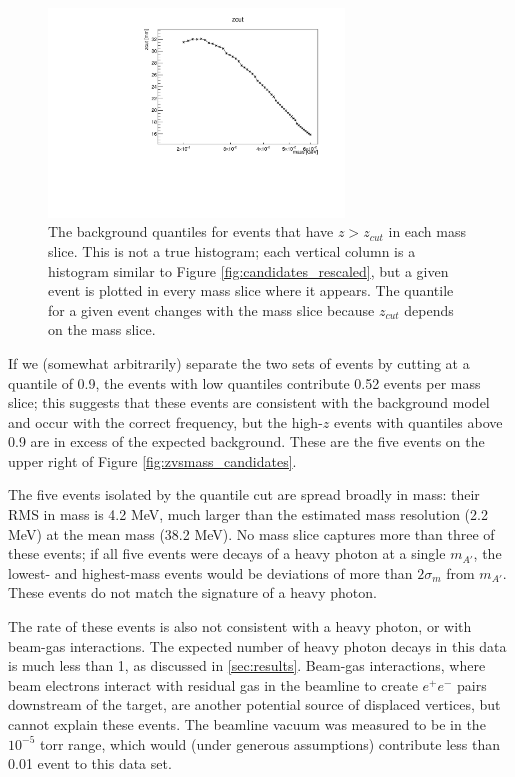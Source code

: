 \begin{figure}[ht]
\begin{center}
    \includegraphics[width=0.7\textwidth,page=7,angle=-90]{vertexing/figs/golden_mres_output}
\end{center}
\caption{The background quantiles for events that have $z>z_{cut}$ in each mass slice.
This is not a true histogram; each vertical column is a histogram similar to Figure \ref{fig:candidates_rescaled}, but a given event is plotted in every mass slice where it appears.
The quantile for a given event changes with the mass slice because $z_{cut}$ depends on the mass slice.
}
    \label{fig:zvsmass_candidates_rescaled}
\end{figure}

If we (somewhat arbitrarily) separate the two sets of events by cutting at a quantile of 0.9, the events with low quantiles contribute 0.52 events per mass slice; this suggests that these events are consistent with the background model and occur with the correct frequency, but the high-$z$ events with quantiles above 0.9 are in excess of the expected background.
These are the five events on the upper right of Figure \ref{fig:zvsmass_candidates}.

The five events isolated by the quantile cut are spread broadly in mass: their RMS in mass is 4.2 MeV, much larger than the estimated mass resolution (2.2 MeV) at the mean mass (38.2 MeV).
No mass slice captures more than three of these events; if all five events were decays of a heavy photon at a single $m_{A'}$, the lowest- and highest-mass events would be deviations of more than $2\sigma_m$ from $m_{A'}$.
These events do not match the signature of a heavy photon.

The rate of these events is also not consistent with a heavy photon, or with beam-gas interactions.
The expected number of heavy photon decays in this data is much less than 1, as discussed in \ref{sec:results}.
Beam-gas interactions, where beam electrons interact with residual gas in the beamline to create $e^+e^-$ pairs downstream of the target, are another potential source of displaced vertices, but cannot explain these events.
The beamline vacuum was measured to be in the $10^{-5}$ torr range, which would (under generous assumptions) contribute less than 0.01 event to this data set.

